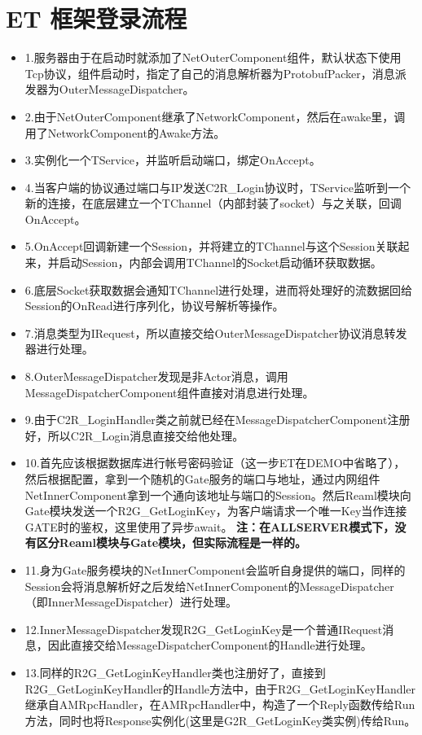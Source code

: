 \documentclass[9pt, b5paper]{article}
\begin{document}
\section{ET 框架登录流程}
\label{sec-7}
\begin{itemize}
\item 1.服务器由于在启动时就添加了NetOuterComponent组件，默认状态下使用Tcp协议，组件启动时，指定了自己的消息解析器为ProtobufPacker，消息派发器为OuterMessageDispatcher。
\item 2.由于NetOuterComponent继承了NetworkComponent，然后在awake里，调用了NetworkComponent的Awake方法。
\item 3.实例化一个TService，并监听启动端口，绑定OnAccept。
\item 4.当客户端的协议通过端口与IP发送C2R\_Login协议时，TService监听到一个新的连接，在底层建立一个TChannel（内部封装了socket）与之关联，回调OnAccept。
\item 5.OnAccept回调新建一个Session，并将建立的TChannel与这个Session关联起来，并启动Session，内部会调用TChannel的Socket启动循环获取数据。
\item 6.底层Socket获取数据会通知TChannel进行处理，进而将处理好的流数据回给Session的OnRead进行序列化，协议号解析等操作。
\item 7.消息类型为IRequest，所以直接交给OuterMessageDispatcher协议消息转发器进行处理。
\item 8.OuterMessageDispatcher发现是非Actor消息，调用MessageDispatcherComponent组件直接对消息进行处理。
\item 9.由于C2R\_LoginHandler类之前就已经在MessageDispatcherComponent注册好，所以C2R\_Login消息直接交给他处理。
\item 10.首先应该根据数据库进行帐号密码验证（这一步ET在DEMO中省略了），然后根据配置，拿到一个随机的Gate服务的端口与地址，通过内网组件NetInnerComponent拿到一个通向该地址与端口的Session。然后Reaml模块向Gate模块发送一个R2G\_GetLoginKey，为客户端请求一个唯一Key当作连接GATE时的鉴权，这里使用了异步await。 \textbf{注：在ALLSERVER模式下，没有区分Reaml模块与Gate模块，但实际流程是一样的。}
\item 11.身为Gate服务模块的NetInnerComponent会监听自身提供的端口，同样的Session会将消息解析好之后发给NetInnerComponent的MessageDispatcher（即InnerMessageDispatcher）进行处理。
\item 12.InnerMessageDispatcher发现R2G\_GetLoginKey是一个普通IRequest消息，因此直接交给MessageDispatcherComponent的Handle进行处理。
\item 13.同样的R2G\_GetLoginKeyHandler类也注册好了，直接到R2G\_GetLoginKeyHandler的Handle方法中，由于R2G\_GetLoginKeyHandler继承自AMRpcHandler，在AMRpcHandler中，构造了一个Reply函数传给Run方法，同时也将Response实例化(这里是G2R\_GetLoginKey类实例)传给Run。

\end{itemize}
\end{document}
